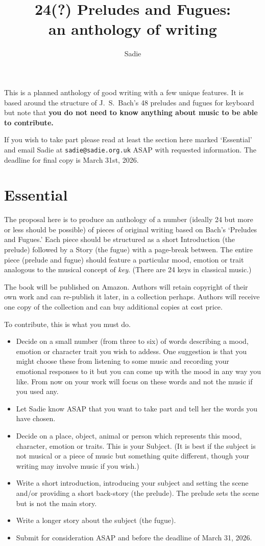 \documentclass[a4paper]{article}
\title{24(?) Preludes and Fugues:\\an anthology of writing}
\author{Sadie}
\begin{document}
\maketitle

This is a planned anthology of good writing with a few unique features.
It is based around the structure of J.~S.~Bach's 48 preludes and
fugues for keyboard but note that \textbf{you do not need to know
  anything about music to be able to contribute.}

If you wish to take part please read at least the section here marked
`Essential' and email Sadie at \texttt{sadie@sadie.org.uk} ASAP with
requested information.  The deadline for final copy is March 31st,
2026.

\section{Essential}

The proposal here is to produce an anthology of a number (ideally 24
but more or less should be possible) of pieces of original writing
based on Bach's `Preludes and Fugues.'  Each piece should be
structured as a short Introduction (the prelude) followed by a Story
(the fugue) with a page-break between.  The entire piece (prelude
and fugue) should feature a particular mood, emotion or trait
analogous to the musical concept of \textit{key}.  (There are 24
keys in classical music.)

The book will be published on Amazon.  Authors will retain copyright
of their own work and can re-publish it later, in a collection
perhaps. Authors will receive one copy of the collection and can
buy additional copies at cost price.

To contribute, this is what you must do.

\begin{itemize}
\item Decide on a small number (from three to six) of words describing
  a mood, emotion or character trait you wish to addess.  One
  suggestion is that you might choose these from listening to some music
  and recording your emotional responses to it 
  but you can come up with the mood in
  any way you like. From now on your work will focus on these words
  and not the music if you used any.
\item Let Sadie know ASAP that you want to take part and tell her
  the words you have chosen.
\item Decide on a place, object, animal or person which represents
  this mood, character, emotion or traits.  This is your Subject.  (It
  is best if the subject is not musical or a piece of music but
  something quite different, though your writing may involve music if
  you wish.)
\item Write a short introduction, introducing your subject and setting
  the scene and/or providing a short back-story (the prelude). The
  prelude sets the scene but is not the main story.
\item Write a longer story about the subject (the fugue). 
\item Submit for consideration ASAP and before the deadline of March 31, 2026.
\end{itemize}
\end{document}
